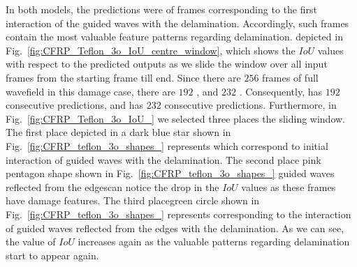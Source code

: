 In both models, the predictions were \DIFdelbegin {}\DIFdelend \DIFaddbegin {}\DIFaddend of frames corresponding to the first interaction of the guided waves with the delamination.
Accordingly, such frames contain the most valuable feature patterns regarding delamination. 
\DIFdelbegin {}\DIFdelend \DIFaddbegin {}\DIFaddend depicted in Fig.~\ref{fig:CFRP_Teflon_3o_IoU_centre_window}, which shows the \(IoU\) values with respect to the predicted outputs as we slide the window over all input frames from the starting frame till \DIFaddbegin {}\DIFaddend end.
Since there are \(256\) frames of full wavefield in this damage case, there are \(192\) \DIFdelbegin {}\DIFdelend \DIFaddbegin {}\DIFaddend {}, and \(232\) \DIFdelbegin {}\DIFdelend \DIFaddbegin {}\DIFaddend {}.
Consequently, \DIFdelbegin {}\DIFdelend \DIFaddbegin {}\DIFaddend {} has \(192\) consecutive predictions, and \DIFdelbegin {}\DIFdelend \DIFaddbegin {}\DIFaddend {} has \(232\) consecutive predictions.
Furthermore, in Fig.~\ref{fig:CFRP_Teflon_3o_IoU_} we selected three places \DIFdelbegin {}\DIFdelend \DIFaddbegin {}\DIFaddend the sliding window. 
The first place depicted in a dark blue star shown in Fig.~\ref{fig:CFRP_teflon_3o_shapes_} represents \DIFdelbegin {}\DIFdelend \DIFaddbegin {}\DIFaddend which correspond to \DIFaddbegin {}\DIFaddend initial interaction of guided waves with the delamination.
The second place \DIFdelbegin {}\DIFdelend \DIFaddbegin {}\DIFaddend pink pentagon shape shown in Fig.~\ref{fig:CFRP_teflon_3o_shapes_} \DIFdelbegin {}\DIFdelend \DIFaddbegin {}\DIFaddend guided waves reflected from the edges\DIFdelbegin {}\DIFdelend \DIFaddbegin {}\DIFaddend can notice the drop in the \(IoU\) values as these frames have \DIFdelbegin {}\DIFdelend \DIFaddbegin {}\DIFaddend damage features.
The third place\DIFdelbegin {}\DIFdelend \DIFaddbegin {}\DIFaddend green circle shown in Fig.~\ref{fig:CFRP_teflon_3o_shapes_} represents \DIFdelbegin {}\DIFdelend \DIFaddbegin {}\DIFaddend corresponding to the interaction of \DIFdelbegin {}\DIFdelend guided waves reflected from the edges with the delamination.
As we can see, the value of \(IoU\) increases again as the valuable \DIFdelbegin {}\DIFdelend \DIFaddbegin {}\DIFaddend patterns regarding delamination start to appear again.
\DIFaddbegin 

